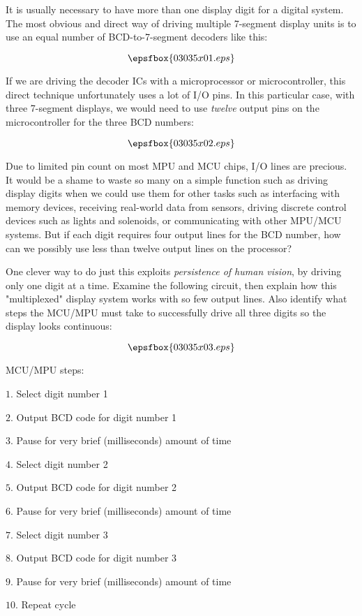

It is usually necessary to have more than one display digit for a digital system.  The most obvious and direct way of driving multiple 7-segment display units is to use an equal number of BCD-to-7-segment decoders like this:

$$\epsfbox{03035x01.eps}$$

If we are driving the decoder ICs with a microprocessor or microcontroller, this direct technique unfortunately uses a lot of I/O pins.  In this particular case, with three 7-segment displays, we would need to use {\it twelve} output pins on the microcontroller for the three BCD numbers:

$$\epsfbox{03035x02.eps}$$

Due to limited pin count on most MPU and MCU chips, I/O lines are precious.  It would be a shame to waste so many on a simple function such as driving display digits when we could use them for other tasks such as interfacing with memory devices, receiving real-world data from sensors, driving discrete control devices such as lights and solenoids, or communicating with other MPU/MCU systems.  But if each digit requires four output lines for the BCD number, how can we possibly use less than twelve output lines on the processor?

One clever way to do just this exploits {\it persistence of human vision}, by driving only one digit at a time.  Examine the following circuit, then explain how this "multiplexed" display system works with so few output lines.  Also identify what steps the MCU/MPU must take to successfully drive all three digits so the display looks continuous:

$$\epsfbox{03035x03.eps}$$







\goodbreak

MCU/MPU steps:

\medskip
\item{$1.$} Select digit number 1
\item{$2.$} Output BCD code for digit number 1
\item{$3.$} Pause for very brief (milliseconds) amount of time
\item{$4.$} Select digit number 2
\item{$5.$} Output BCD code for digit number 2
\item{$6.$} Pause for very brief (milliseconds) amount of time
\item{$7.$} Select digit number 3
\item{$8.$} Output BCD code for digit number 3
\item{$9.$} Pause for very brief (milliseconds) amount of time
\item{$10.$} Repeat cycle
\medskip

